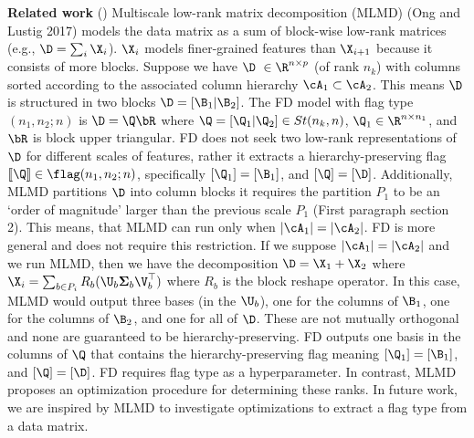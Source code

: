 \documentclass[10pt,twocolumn,letterpaper]{article}
\begin{document}
\noindent \textbf{Related work} (\Rfour) Multiscale low-rank matrix decomposition (MLMD) (Ong and Lustig 2017) models the data matrix as a sum of block-wise low-rank matrices (e.g., $\D = \sum_i \X_i$). $\X_i$ models finer-grained features than $\X_{i+1}$ because it consists of more blocks. Suppose we have $\D\ \in \R^{n \times p}$ (of rank $n_k$) with columns sorted according to the associated column hierarchy $\cA_1 \subset \cA_2$. This means $\D$ is structured in two blocks $\D = [\B_1|\B_2]$. The FD model with flag type $(n_1,n_2;n)$ is $\D = \Q \bR$ where $\Q = [\Q_1 | \Q_2] \in St(n_k,n)$, $\Q_1 \in \R^{n \times n_1}$, and $\bR$ is block upper triangular. FD does not seek two low-rank representations of $\D$ for different scales of features, rather it extracts a hierarchy-preserving flag $[\![\Q]\!] \in \flag(n_1,n_2;n)$, specifically $[\Q_1]=[\B_1]$, and $[\Q] = [\D]$. Additionally, MLMD partitions $\D$ into column blocks it requires the partition $P_1$ to be an `order of magnitude' larger than the previous scale $P_1$ (First paragraph section 2). This means, that MLMD can run only when $|\cA_1| = |\cA_2|$. FD is more general and does not require this restriction. If we suppose $|\cA_1| = |\cA_2|$ and we run MLMD, then we have the decomposition $\D = \X_1 + \X_2$ where $\X_i = \sum_{b \in P_i} R_b (\U_b \boldsymbol{\Sigma}_b \V^\top_b)$ where $R_b$ is the block reshape operator. In this case, MLMD would output three bases (in the $\U_b$), one for the columns of $\B_1$, one for the columns of $\B_2$, and one for all of $\D$. These are not mutually orthogonal and none are guaranteed to be hierarchy-preserving. FD outputs one basis in the columns of $\Q$ that contains the hierarchy-preserving flag meaning $[\Q_1]=[\B_1]$, and $[\Q] = [\D]$. FD requires flag type as a hyperparameter. In contrast, MLMD proposes an optimization procedure for determining these ranks. In future work, we are inspired by MLMD to investigate optimizations to extract a flag type from a data matrix.




\end{document}
